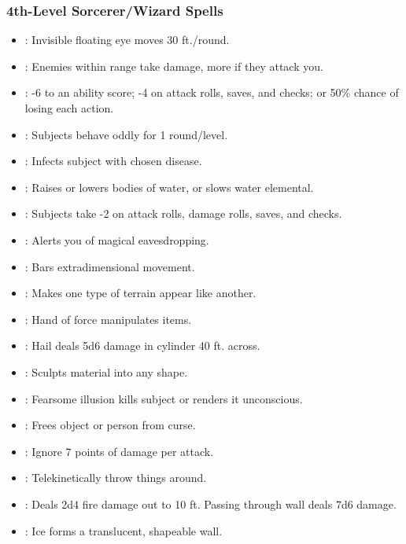 \subsubsection{4th-Level Sorcerer/Wizard Spells}
\begin{itemize}
\item {}: Invisible floating eye moves 30 ft./round.
\item {}: Enemies within range take damage, more if they attack you.
\item {}: -6 to an ability score; -4 on attack rolls, saves, and checks; or 50\% chance of losing each action.
\item {}: Subjects behave oddly for 1 round/level.
\item {}: Infects subject with chosen disease.
\item {}: Raises or lowers bodies of water, or slows water elemental.
\item {}: Subjects take -2 on attack rolls, damage rolls, saves, and checks.
\item {}: Alerts you of magical eavesdropping.
\item {}: Bars extradimensional movement.
\item {}: Makes one type of terrain appear like another.
\item {}: Hand of force manipulates items.
\item {}: Hail deals 5d6 damage in cylinder 40 ft. across.
\item {}: Sculpts material into any shape.
\item {}: Fearsome illusion kills subject or renders it unconscious.
\item {}: Frees object or person from curse.
\item {}: Ignore 7 points of damage per attack.
\item {}: Telekinetically throw things around.
\item {}: Deals 2d4 fire damage out to 10 ft. Passing through wall deals 7d6 damage.
\item {}: Ice forms a translucent, shapeable wall.
\end{itemize}
